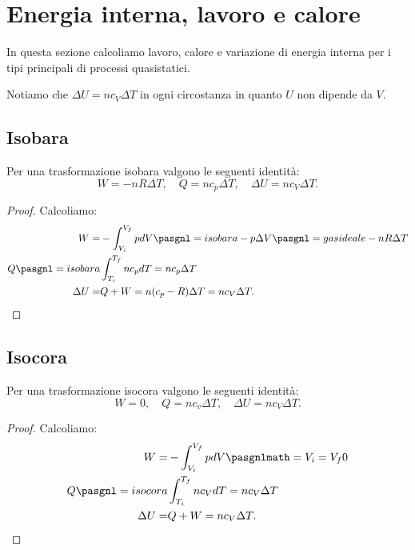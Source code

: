 \section{Energia interna, lavoro e calore}

\noindent In questa sezione calcoliamo lavoro, calore e variazione di energia interna per i tipi principali di processi quasistatici.\medskip

\noindent Notiamo che $\Delta U=nc_V\Delta T$ in ogni circostanza in quanto $U$ non dipende da $V$.
\subsection{Isobara}
\begin{proposition}\label{EnergieIsobara}
Per una trasformazione isobara valgono le seguenti identit\`a:
\[W=-nR\Delta T,\quad
Q=nc_p\Delta T,\quad
\Delta U=nc_V\Delta T.\]
\end{proposition}
\begin{proof}
Calcoliamo:
\begin{align*}
W=&-\int_{V_i}^{V_f}pdV\pasgnl={isobara}-p\Delta V\pasgnl={gas ideale}-nR\Delta T\\
Q\pasgnl={isobara}&\int_{T_i}^{T_f}nc_pdT=nc_p\Delta T\\
\Delta U=&Q+W=n(c_p-R)\Delta T=nc_V\Delta T.
\end{align*}
\end{proof}

\subsection{Isocora}
\begin{proposition}\label{EnergieIsocora}
Per una trasformazione isocora valgono le seguenti identit\`a:
\[W=0,\quad
Q=nc_v\Delta T,\quad
\Delta U=nc_V\Delta T.\]
\end{proposition}
\begin{proof}
Calcoliamo:
\begin{align*}
W=&-\int_{V_i}^{V_f}pdV\pasgnlmath={V_i=V_f}0\\
Q\pasgnl={isocora}&\int_{T_i}^{T_f}nc_VdT=nc_V\Delta T\\
\Delta U=&Q+W=nc_V\Delta T.
\end{align*}
\end{proof}

